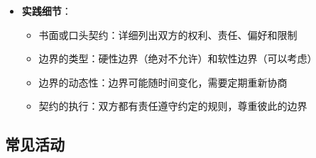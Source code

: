 \documentclass[12pt,UTF8]{ctexbook}
\begin{document}
\begin{itemize}
\begin{itemize}
    \item \textbf{实践细节}：
      \begin{itemize}
      \item 书面或口头契约：详细列出双方的权利、责任、偏好和限制
      \item 边界的类型：硬性边界（绝对不允许）和软性边界（可以考虑）
      \item 边界的动态性：边界可能随时间变化，需要定期重新协商
      \item 契约的执行：双方都有责任遵守约定的规则，尊重彼此的边界
      \end{itemize}
    \end{itemize}
  \end{itemize}

\subsection{常见活动}
\end{document}
